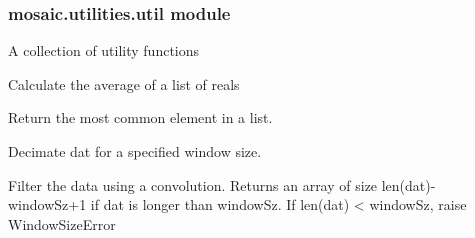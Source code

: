 \documentclass[letterpaper,10pt,english]{sphinxmanual}
\begin{document}
\subsubsection{mosaic.utilities.util module}
\label{api-doc/mosaic.misc:mosaic-utilities-util-module}\label{api-doc/mosaic.misc:module-mosaic.utilities.util}
A collection of utility functions

\begin{fulllineitems}
\label{api-doc/mosaic.misc:mosaic.utilities.util.avg}
Calculate the average of a list of reals

\end{fulllineitems}


\begin{fulllineitems}
\label{api-doc/mosaic.misc:mosaic.utilities.util.commonest}
Return the most common element in a list.

\end{fulllineitems}


\begin{fulllineitems}
\label{api-doc/mosaic.misc:mosaic.utilities.util.decimate}
Decimate dat for a specified window size.

\end{fulllineitems}


\begin{fulllineitems}
\label{api-doc/mosaic.misc:mosaic.utilities.util.filter}
Filter the data using a convolution. Returns an
array of size len(dat)-windowSz+1 if dat is longer than 
windowSz. If len(dat) \textless{} windowSz, raise WindowSizeError

\end{fulllineitems}

\end{document}
